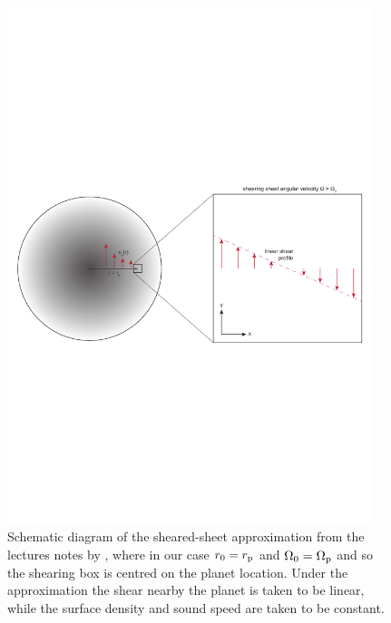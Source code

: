 \begin{figure}
    \centering
    \includegraphics[width = 0.95\textwidth]{figures/shearing_sheet.pdf}
    \caption{Schematic diagram of the sheared-sheet approximation from the lectures notes by \citet{armitage2022}, where in our case $r_0 = r_{\rm p}$ and $\Omega_0 = \Omega_{\rm p}$ and so the shearing box is centred on the planet location.
    Under the approximation the shear nearby the planet is taken to be linear, while the surface density and sound speed are taken to be constant.}
    \label{fig:sheared_sheet}
\end{figure}

